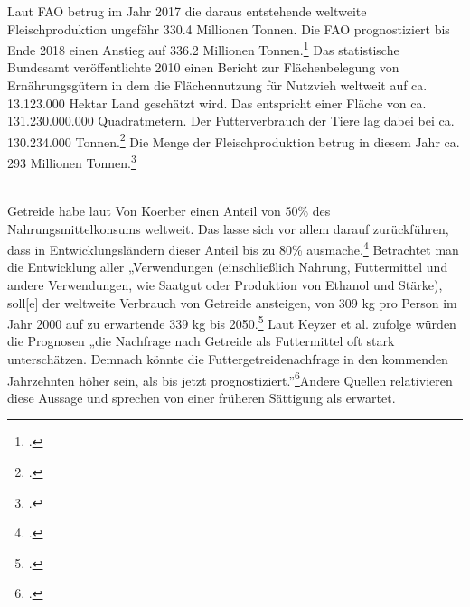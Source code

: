 \documentclass{scrartcl}
\begin{document}
Laut FAO betrug im Jahr 2017 die daraus entstehende weltweite Fleischproduktion ungefähr 330.4 Millionen Tonnen. Die FAO prognostiziert bis Ende 2018 einen Anstieg auf 336.2 Millionen Tonnen.\footcite[Vgl.][S. 7]{Bedford2017FoodMarkets} Das statistische Bundesamt veröffentlichte 2010 einen Bericht zur Flächenbelegung von Ernährungsgütern in dem die Flächennutzung für Nutzvieh weltweit auf ca. 13.123.000 Hektar Land geschätzt wird. Das entspricht einer Fläche von ca. 131.230.000.000 Quadratmetern. Der Futterverbrauch der Tiere lag dabei bei ca. 130.234.000 Tonnen.\footcite[Vgl.][S. 9]{StatistischesBundesamt2010Flachenbelegung2010} Die Menge der Fleischproduktion betrug in diesem Jahr ca. 293 Millionen Tonnen.\footcite[Vgl.][S. 9]{Sharma2014TheImpacts} 

%

\\Getreide habe laut Von Koerber einen Anteil von 50\% des Nahrungsmittelkonsums weltweit. Das lasse sich vor allem darauf zurückführen, dass in Entwicklungsländern dieser Anteil bis zu 80\% ausmache.\footcite[Vgl.][S.4ff]{VonKoerber2008Globale-trends}
Betrachtet man die Entwicklung aller „Verwendungen (einschließlich Nahrung, Futtermittel und andere Verwendungen, wie Saatgut oder Produktion von Ethanol und Stärke), soll[e] der weltweite Verbrauch von Getreide ansteigen, von 309 kg pro Person im Jahr 2000 auf zu erwartende 339 kg bis 2050.\footcites[S.3ff]{VonKoerber2008Globale-trends}[vgl.][S.23ff]{FAO2006World2030/2050} 
Laut Keyzer et al. zufolge würden die Prognosen „die Nachfrage nach Getreide als Futtermittel oft stark unterschätzen. Demnach könnte die Futtergetreidenachfrage in den kommenden Jahrzehnten höher sein, als bis jetzt prognostiziert.”\footcite[S.3f]{VonKoerber2008Globale-trends}Andere Quellen relativieren diese Aussage und sprechen von einer früheren Sättigung als erwartet.\\
\end{document}

